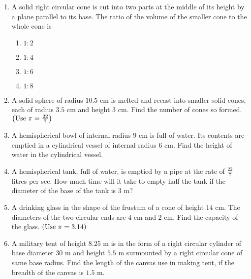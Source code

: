 \begin{enumerate}
\item A solid right circular cone is cut into two parts at the middle of its height by a plane parallel to its base. The ratio of the volume of the smaller cone to the whole cone is\\
\begin{enumerate}
\item $1 : 2$\\
\item $1 : 4$\\
\item $1 : 6$\\
\item $1 : 8$\\
\end{enumerate}

\item A solid sphere of radius $10.5 \text{ cm}$ is melted and recast into smaller solid cones, each of radius $3.5 \text{ cm}$ and height $3 \text{ cm}$. Find the number of cones so formed. $\left(\text{Use } \pi = \frac{22}{7}\right)$\\

\item A hemispherical bowl of internal radius $9 \text{ cm}$ is full of water. Its contents are emptied in a cylindrical vessel of internal radius $6 \text{ cm}$. Find the height of water in the cylindrical vessel.\\


\item A hemispherical tank, full of water, is emptied by a pipe at the rate of $\frac{22}{7}$ litres per sec. How much time will it take to empty half the tank if the diameter of the base of the tank is $3 \text{ m}$?\\

\item A drinking glass in the shape of the frustum of a cone of height $14 \text{ cm}$. The diameters of the two circular ends are $4 \text{ cm}$ and $2 \text{ cm}$. Find the capacity of the glass.  $\left(\text{Use } \pi = 3.14\right)$\\

\item  A military tent of height $8.25 \text{ m}$ is in the form of a right circular cylinder of base diameter $30 \text{ m}$ and height $5.5 \text{ m}$ surmounted by a right circular cone of same base radius. Find the length of the canvas use in making tent, if the breadth of the canvas is $1.5 \text{ m}$.\\


\end{enumerate}
